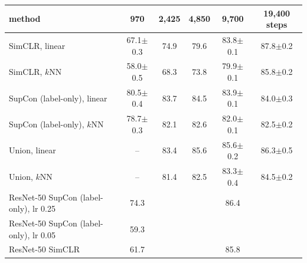 \begin{tabular}{l ccccc}
\toprule
method & 970 & 2,425 & 4,850 & 9,700 & 19,400 steps \\
\midrule
SimCLR, linear & 67.1{\scriptsize$\pm$0.3} & 74.9 & 79.6 & 83.8{\scriptsize$\pm$0.1} & 87.8{\scriptsize$\pm$0.2} \\
SimCLR, $k$NN & 58.0{\scriptsize$\pm$0.5} & 68.3 & 73.8 & 79.9{\scriptsize$\pm$0.1} & 85.8{\scriptsize$\pm$0.2} \\
SupCon (label-only), linear & 80.5{\scriptsize$\pm$0.4} & 83.7 & 84.5 & 83.9{\scriptsize$\pm$0.1} & 84.0{\scriptsize$\pm$0.3} \\
SupCon (label-only), $k$NN & 78.7{\scriptsize$\pm$0.3} & 82.1 & 82.6 & 82.0{\scriptsize$\pm$0.1} & 82.5{\scriptsize$\pm$0.2} \\
Union, linear & -- & 83.4 & 85.6 & 85.6{\scriptsize$\pm$0.2} & 86.3{\scriptsize$\pm$0.5} \\
Union, $k$NN & -- & 81.4 & 82.5 & 83.3{\scriptsize$\pm$0.4} & 84.5{\scriptsize$\pm$0.2} \\
\midrule
ResNet-50 SupCon (label-only), lr 0.25 & 74.3 & & & 86.4 & \\
ResNet-50 SupCon (label-only), lr 0.05 & 59.3 & & & & \\
ResNet-50 SimCLR & 61.7 & & & 85.8 & \\
\bottomrule
\end{tabular}
